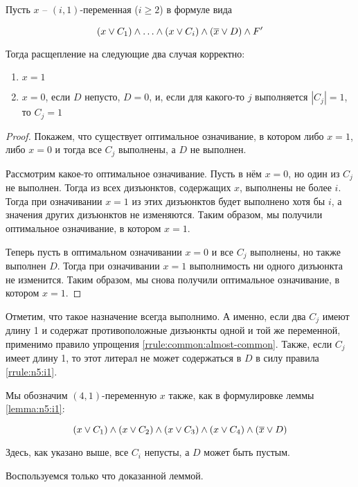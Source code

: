 \begin{lemma}
 Пусть $x$ -- $(i,1)$-переменная ($i \geq 2$) в формуле вида

 $$
  (x \vee C_1) \wedge \ldots \wedge (x \vee C_i) \wedge (\overline{x} \vee D) \wedge F'
 $$

 Тогда расщепление на следующие два случая корректно:
 \begin{enumerate}
  \item $x = 1$
  \item $x = 0$, если $D$ непусто, $D = 0$, и, если для какого-то $j$ выполняется $|C_j| = 1$, то $C_j = 1$
 \end{enumerate}
 \label{lemma:n5:i1}
\end{lemma}

\begin{proof}
 Покажем, что существует оптимальное означивание, в котором либо $x = 1$, либо $x = 0$ и тогда все $C_j$ выполнены, а $D$ не выполнен.

 Рассмотрим какое-то оптимальное означивание. Пусть в нём $x = 0$, но один из $C_j$ не выполнен. Тогда из всех дизъюнктов, содержащих $x$, выполнены не более $i$. Тогда при означивании $x = 1$ из этих дизъюнктов будет выполнено хотя бы $i$, а значения других дизъюнктов не изменяются. Таким образом, мы получили оптимальное означивание, в котором $x = 1$.

 Теперь пусть в оптимальном означивании $x = 0$ и все $C_j$ выполнены, но также выполнен $D$. Тогда при означивании $x = 1$ выполнимость ни одного дизъюнкта не изменится. Таким образом, мы снова получили оптимальное означивание, в котором $x = 1$.
\end{proof}

\begin{note}
 Отметим, что такое назначение всегда выполнимо. А именно, если два $C_j$ имеют длину 1 и содержат противоположные дизъюнкты одной и той же переменной, применимо правило упрощения \ref{rrule:common:almost-common}. Также, если $C_j$ имеет длину 1, то этот литерал не может содержаться в $D$ в силу правила \ref{rrule:n5:i1}.
\end{note}

Мы обозначим $(4,1)$-переменную $x$ также, как в формулировке леммы \ref{lemma:n5:i1}:

$$
 (x \vee C_1) \wedge (x \vee C_2) \wedge (x \vee C_3) \wedge (x \vee C_4) \wedge (\overline{x} \vee D)
$$

Здесь, как указано выше, все $C_i$ непусты, а $D$ может быть пустым.

Воспользуемся только что доказанной леммой.

